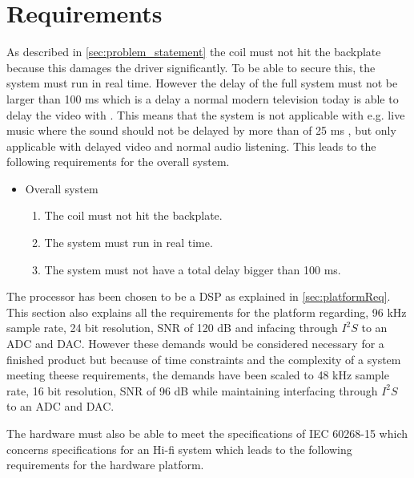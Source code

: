 \chapter{Requirements} \label{ch:requirements}
As described in \autoref{sec:problem_statement} the coil must not hit the backplate because this damages the driver significantly. To be able to secure this, the system must run in real time. However the delay of the full system must not be larger than 100 ms which is a delay a normal modern television today is able to delay the video with \citep{sou:tvDelay}. This means that the system is not applicable with e.g. live music where the sound should not be delayed by more than of 25 ms \citep{sou:liveAudio}, but only applicable with delayed video and normal audio listening. This leads to the following requirements for the overall system.

\begin{itemize}
\item Overall system
\begin{enumerate}
\item [\textlabel{1}{coil}] The coil must not hit the backplate.\\
\item [\textlabel{2}{realtime}] The system must run in real time. \\
\item [\textlabel{3}{delay}] The system must not have a total delay bigger than 100 ms.
\end{enumerate}
\end{itemize}

The processor has been chosen to be a DSP as explained in \autoref{sec:platformReq}. This section also explains all the requirements for the platform regarding, 96 kHz sample rate, 24 bit resolution, SNR of 120 dB and infacing through $I^2S$ to an ADC and DAC. However these demands would be considered necessary for a finished product but because of time constraints and the complexity of a system meeting theese requirements, the demands have been scaled to 48 kHz sample rate, 16 bit resolution, SNR of 96 dB while maintaining interfacing through $I^2S$ to an ADC and DAC. 

The hardware must also be able to meet the specifications of IEC 60268-15 which concerns specifications for an Hi-fi  system which leads to the following requirements for the hardware platform.

